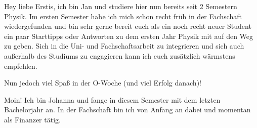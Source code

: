 \begin{multicols*}{2}
{Hey liebe Erstis, ich bin Jan und studiere hier nun bereits seit 2 Semestern Physik. Im ersten Semester habe ich mich schon recht früh in der Fachschaft wiedergefunden und bin sehr gerne bereit euch als ein noch recht neuer Student ein paar Starttipps oder Antworten zu dem ersten Jahr Physik mit auf den Weg zu geben. Sich in die Uni- und Fachschaftsarbeit zu integrieren und sich auch außerhalb des Studiums zu engagieren kann ich euch zusätzlich wärmstens empfehlen.

Nun jedoch viel Spaß in der O-Woche (und viel Erfolg danach)!
}

{Moin! Ich bin Johanna und fange in diesem Semester mit dem letzten Bachelorjahr an. In der Fachschaft bin ich von Anfang an dabei und momentan als Finanzer tätig.
\vspace{2\baselineskip}}


\end{multicols*}
